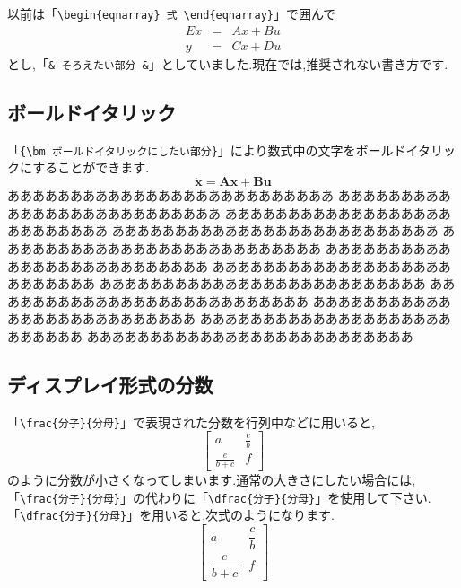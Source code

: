 以前は「{\verb+\begin{eqnarray} 式 \end{eqnarray}+}」で囲んで
\begin{eqnarray}
  E\dot{x} &=& Ax + Bu \\
  y &=& Cx + Du
\end{eqnarray}
とし,「{\verb+& そろえたい部分 &+}」としていました.現在では,推奨されない書き方です.

\subsection{ボールドイタリック}
「{\verb+{\bm ボールドイタリックにしたい部分}+}」により数式中の文字をボールドイタリックにすることができます.
\begin{equation}
  \dot{\bm x} = {\bm A}{\bm x} + {\bm B}{\bm u}
\end{equation}
ああああああああああああああああああああああああああ
ああああああああああああああああああああああああああ
ああああああああああああああああああああああああああ
ああああああああああああああああああああああああああ
ああああああああああああああああああああああああああ
ああああああああああああああああああああああああああ
ああああああああああああああああああああああああああ
ああああああああああああああああああああああああああ
ああああああああああああああああああああああああああ
ああああああああああああああああああああああああああ
ああああああああああああああああああああああああああ
ああああああああああああああああああああああああああ

\subsection{ディスプレイ形式の分数}
「{\verb+\frac{分子}{分母}+}」で表現された分数を行列中などに用いると,
\begin{equation}
  \left[ \begin{array}{cc}
      a               & \frac{c}{b} \\
      \frac{e}{b + c} & f
    \end{array} \right]
\end{equation}
のように分数が小さくなってしまいます.通常の大きさにしたい場合には,「{\verb+\frac{分子}{分母}+}」の代わりに「{\verb+\dfrac{分子}{分母}+}」を使用して下さい.「{\verb+\dfrac{分子}{分母}+}」を用いると,次式のようになります.
\begin{equation}
  \left[ \begin{array}{cc}
      a                & \dfrac{c}{b} \\
      \dfrac{e}{b + c} & f
    \end{array} \right]
\end{equation}

